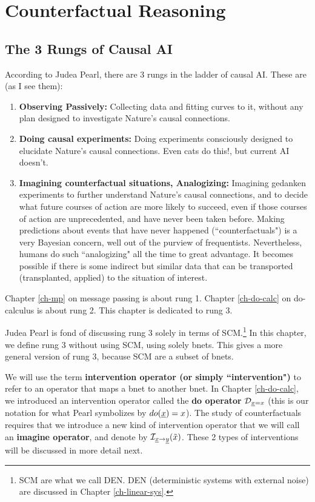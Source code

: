 \chapter{Counterfactual Reasoning}
\label{ch-counterf}


\section{The 3 Rungs of Causal AI}
According to 
Judea Pearl,
there are 3 rungs in the
ladder of causal AI.
These are (as I see them):
\begin{enumerate}
\item
{\bf Observing Passively:} Collecting 
data
and fitting curves to it,
without any plan 
designed to
investigate Nature's 
causal connections.
\item {\bf Doing causal
experiments:} 
Doing experiments 
consciously designed to
elucidate
Nature's causal connections.
Even cats do this!, but current AI doesn't.
\item {\bf Imagining
 counterfactual situations, Analogizing:}
Imagining gedanken experiments
to further understand
Nature's causal connections,
and to decide what future
courses of action are
more likely to succeed,
even if
those courses of action
are unprecedented, and have never been taken before.
Making
predictions about
 events that have never happened (``counterfactuals")
is a very Bayesian
concern, well out of the purview of 
frequentists. Nevertheless,
humans do such
``analogizing" 
all the time to great advantage.
It becomes
possible if there
is some indirect but similar
data that can be transported
(transplanted, applied)
to the situation of
interest.
\end{enumerate}
Chapter \ref{ch-mp}
on message passing
is about rung 1.
Chapter \ref{ch-do-calc}
on do-calculus is about rung 2.
This chapter is dedicated to rung 3.

Judea Pearl 
is fond of discussing rung 3 solely
in terms of SCM.\footnote{SCM are 
what we call DEN. DEN (deterministic systems
with external noise) are discussed in
Chapter \ref{ch-linear-sys}. }
In this chapter,
we define rung 3
without using SCM, using solely
bnets.
This gives a more general
version of rung 3,
because SCM are a subset of bnets.



We will use the
term {\bf intervention operator (or simply ``intervention")} 
to refer to an operator
that maps a bnet to another bnet.
In Chapter \ref{ch-do-calc},
we introduced an intervention operator
 called the {\bf do operator}
${\cal D}_{{\underline{x}}=x}$ (this is our notation for what Pearl 
symbolizes by $do({\underline{x}})=x$).
The study of counterfactuals 
requires that we
introduce a new
kind of intervention 
operator that we will
call an {\bf imagine operator},
and denote by ${\cal I}_{{\underline{x}}\rightarrow{\underline{y}}}(\tilde{x})$.
These 2 types of interventions will be discussed 
in more detail next.

